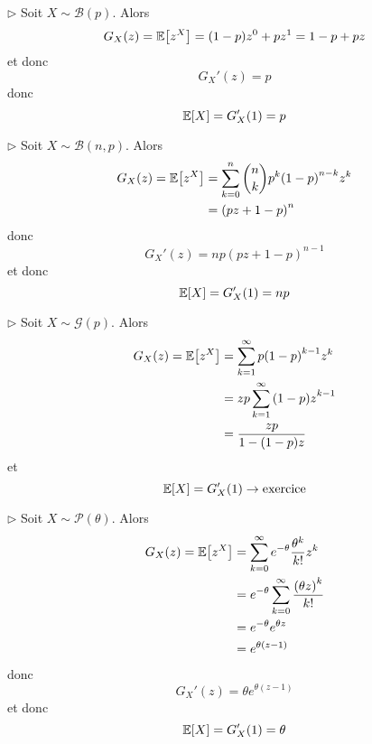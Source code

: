 \begin{example}
    \(\triangleright\) Soit \(X\sim\mathcal B(p)\). Alors
    \begin{equation*}
        G_X(z) = \mathbb{E}\mathopen{}\left[z^X\right]\mathclose{} = (1-p)z^0 + pz^1 = 1-p+pz
    \end{equation*}
    et donc
    \begin{equation*}
        G_X'(z) = p
    \end{equation*}
    donc
    \begin{equation*}
        \mathbb{E}\mathopen{}\left[X\right]\mathclose{} = G_X'(1) = p
    \end{equation*}

    \(\triangleright\) Soit \(X\sim\mathcal B(n,p)\). Alors
    \begin{equation*}
        \begin{aligned}
            G_X(z) = \mathbb{E}\mathopen{}\left[z^X\right]\mathclose{}
            &= \sum_{k=0}^n \binom{n}{k}p^k{(1-p)}^{n-k}z^k\\
            &= {(pz + 1-p)}^n
        \end{aligned}
    \end{equation*}
    donc
    \begin{equation*}
        G_X'(z) = np{(pz + 1-p)}^{n-1}
    \end{equation*}
    et donc
    \begin{equation*}
        \mathbb{E}\mathopen{}\left[X\right]\mathclose{} = G_X'(1) = np
    \end{equation*}

    \(\triangleright\) Soit \(X\sim\mathcal G(p)\). Alors
    \begin{equation*}
        \begin{aligned}
            G_X(z) = \mathbb{E}\mathopen{}\left[z^X\right]\mathclose{}
            &= \sum_{k=1}^{\infty} p{(1-p)}^{k-1}z^k\\
            &= zp\sum_{k=1}^{\infty} {(1-p)z}^{k-1}\\
            &= \frac{zp}{1-(1-p)z}
        \end{aligned}
    \end{equation*}
    et
    \begin{equation*}
        \mathbb{E}\mathopen{}\left[X\right]\mathclose{} = G_X'(1) \to \text{exercice}
    \end{equation*}

    \(\triangleright\) Soit \(X\sim\mathcal P(\theta)\). Alors
    \begin{equation*}
        \begin{aligned}
            G_X(z) = \mathbb{E}\mathopen{}\left[z^X\right]\mathclose{}
            &= \sum_{k=0}^{\infty} e^{-\theta}\frac{\theta^k}{k!}z^k\\
            &= e^{-\theta}\sum_{k=0}^{\infty} \frac{{(\theta z)}^k}{k!}\\
            &= e^{-\theta}e^{\theta z}\\
            &= e^{\theta(z-1)}
        \end{aligned}
    \end{equation*}
    donc
    \begin{equation*}
        G_X'(z) = \theta e^{\theta(z-1)}
    \end{equation*}
    et donc
    \begin{equation*}
        \mathbb{E}\mathopen{}\left[X\right]\mathclose{} = G_X'(1) = \theta
    \end{equation*}
\end{example}